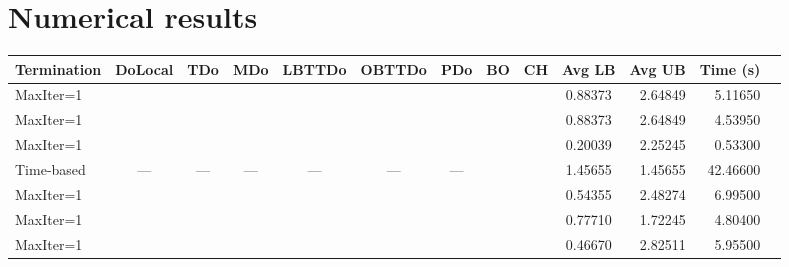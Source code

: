 \documentclass[12pt,a4paper]{article}
\numberwithin{equation}{section}
\theoremstyle{mytheorem}
\theoremstyle{myremark}
\theoremstyle{myparagraph}
\newcommand{\yes}{\ding{51}}
\newcommand{\no}{\ding{55}}
\newcommand{\na}{---} %
\begin{document}
    \section{Numerical results}

    \begin{table}[ht]
        \centering
        \scriptsize
        \renewcommand{\arraystretch}{1.2}
        \setlength{\tabcolsep}{4pt}
        \begin{threeparttable}
            \begin{tabular}{l c c c c c c c c c r r r}
                \toprule
                \textbf{Termination} & \textbf{DoLocal} & \textbf{TDo} & \textbf{MDo} & \textbf{LBTTDo} & \textbf{OBTTDo} & \textbf{PDo} & \textbf{BO} & \textbf{CH} & \textbf{Avg LB} & \textbf{Avg UB} & \textbf{Time (s)} \\
                \midrule
                MaxIter=1            & \yes             & \yes         & \yes         & \yes            & \yes            & \yes         & \no         & \no         & 0.88373         & 2.64849         & 5.11650           \\
                MaxIter=1            & \no              & \no          & \no          & \yes            & \no             & \no          & \no         & \no         & 0.88373         & 2.64849         & 4.53950           \\
                MaxIter=1            & \yes             & \yes         & \yes         & \no             & \yes            & \yes         & \no         & \no         & 0.20039         & 2.25245         & 0.53300           \\
                Time-based           & \na              & \na          & \na          & \na             & \na             & \na          & \no         & \no         & 1.45655         & 1.45655         & 42.46600          \\
                MaxIter=1            & \yes             & \yes         & \yes         & \yes            & \yes            & \yes         & \yes        & \no         & 0.54355         & 2.48274         & 6.99500           \\
                MaxIter=1            & \yes             & \yes         & \yes         & \yes            & \yes            & \yes         & \no         & \yes        & 0.77710         & 1.72245         & 4.80400           \\
                MaxIter=1            & \yes             & \yes         & \yes         & \yes            & \yes            & \yes         & \yes        & \yes        & 0.46670         & 2.82511         & 5.95500           \\

\end{tabular}
\end{threeparttable}
\end{table}
\end{document}
